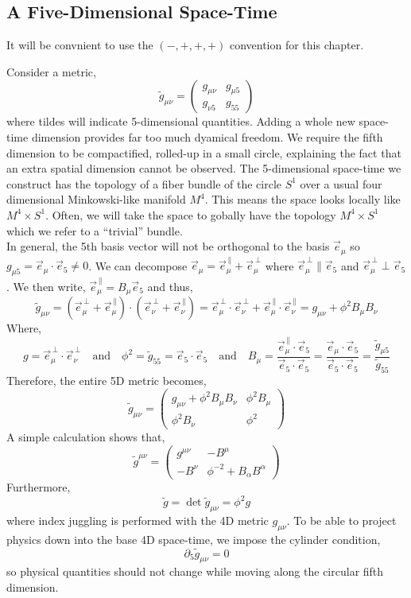 \documentclass[11pt, a4paper]{article}
\begin{document}
\subsection{A Five-Dimensional Space-Time}
\begin{remark}
It will be convnient to use the $(-, +, +, +)$ convention for this chapter.
\end{remark}
\noindent
Consider a metric,
\[ \tilde{g}_{\mu \nu} = \begin{pmatrix}
g_{\mu \nu} & g_{\mu 5} \\
g_{\nu 5} & g_{55}
\end{pmatrix}\]
where tildes will indicate 5-dimensional quantities. Adding a whole new space-time dimension provides far too much dyamical freedom. We require the fifth dimension to be compactified, rolled-up in a small circle, explaining the fact that an extra spatial dimension cannot be observed. The 5-dimensional space-time we construct has the topology of a fiber bundle of the circle $S^1$ over a usual four dimensional Minkowski-like manifold $M^4$. This means the space looks locally like $M^4 \times S^1$. Often, we will take the space to gobally have the topology $M^4 \times S^1$ which we refer to a ``trivial'' bundle.
\bigskip\\
In general, the 5th basis vector will not be orthogonal to the basis $\vec{e}_\mu$ so $g_{\mu 5} = \vec{e}_\mu \cdot \vec{e}_5 \neq 0$. We can decompose $\vec{e}_\mu = \vec{e}_{\mu}^{\, \parallel} + \vec{e}_\mu^{\, \perp}$ where $\vec{e}_{\mu}^{\, \perp} \parallel \vec{e}_5$ and $\vec{e}_{\mu}^{\, \perp} \perp \vec{e}_5$. We then write, $\vec{e}_{\mu}^{\, \parallel} = B_\mu \vec{e}_5$ and thus,
\[ \tilde{g}_{\mu \nu} =  (\vec{e}_{\mu}^{\, \perp} + \vec{e}_\mu^{\, \parallel}) \cdot (\vec{e}_{\nu}^{\, \perp} + \vec{e}_\nu^{\, \parallel}) = \vec{e}_{\mu}^{\, \perp} \cdot \vec{e}_{\nu}^{\, \perp} + \vec{e}_\mu^{\, \parallel} \cdot \vec{e}_{\nu}^{\, \parallel} = g_{\mu \nu} + \phi^2 B_\mu B_\nu \]
Where,
\[g = \vec{e}^{\, \perp}_{\mu} \cdot \vec{e}^{\, \perp}_{\nu} \quad \text{and} \quad \phi^2 = \tilde{g}_{55} = \vec{e}_5 \cdot \vec{e}_5 \quad \text{and} \quad B_\mu = \frac{\vec{e}^{\, \parallel}_\mu \cdot \vec{e}_5}{\vec{e}_5 \cdot \vec{e}_5} = \frac{\vec{e}_\mu \cdot \vec{e}_5}{\vec{e}_5 \cdot \vec{e}_5} =  \frac{\tilde{g}_{\mu5}}{\tilde{g}_{55}} \]
Therefore, the entire 5D metric becomes,
\[ \tilde{g}_{\mu \nu} = \begin{pmatrix}
g_{\mu \nu} + \phi^2 B_\mu B_\nu & \phi^2 B_\mu \\
\phi^2 B_\nu & \phi^2
\end{pmatrix}\]
A simple calculation shows that,
\[ \tilde{g}^{\mu \nu} = 
\begin{pmatrix}
g^{\mu \nu} & - B^\mu \\
- B^\nu & \phi^{-2} + B_\alpha B^\alpha
\end{pmatrix}\]
Furthermore,
\[ \tilde{g} = \det{\tilde{g}_{\mu \nu}} = \phi^2 g \] 
where index juggling is performed with the 4D metric $g_{\mu \nu}$. To be able to project physics down into the base 4D space-time, we impose the cylinder condition,
\[ \partial_5 \tilde{g}_{\mu \nu} = 0 \]
so physical quantities should not change while moving along the circular fifth dimension. 
\end{document}
